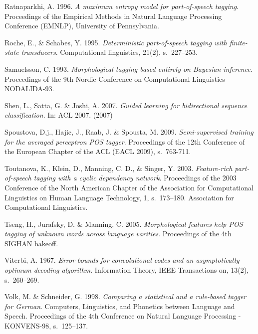 \documentclass[utf8,bachelor,manualbib]{gradu3}
\begin{document}
\begin{thebibliography}{}
Ratnaparkhi, A. 1996. \textit{A maximum entropy model for part-of-speech tagging}. Proceedings of the Empirical Methods in Natural Language Processing Conference (EMNLP), University of Pennsylvania.

Roche, E., \& Schabes, Y. 1995. \textit{Deterministic part-of-speech tagging with finite-state transducers}. Computational linguistics, 21(2), s.~227--253.

Samuelsson, C. 1993. \textit{Morphological tagging based entirely on Bayesian inference}. Proceedings of the 9th Nordic Conference on Computational Linguistics NODALIDA-93.

Shen, L., Satta, G. \& Joshi, A. 2007. \textit{Guided learning for bidirectional sequence classification}. In: ACL 2007. (2007)

Spoustova, D.j., Hajic, J., Raab, J. \& Spousta, M. 2009. \textit{Semi-supervised training for the averaged perceptron POS tagger}. Proceedings of the 12th Conference of the
European Chapter of the ACL (EACL 2009), s.~763-711.

Toutanova, K., Klein, D., Manning, C. D., \& Singer, Y. 2003. \textit{Feature-rich part-of-speech tagging with a cyclic dependency network}. Proceedings of the 2003 Conference of the North American Chapter of the Association for Computational Linguistics on Human Language Technology, 1, s.~173--180. Association for Computational Linguistics.

Tseng, H., Jurafsky, D. \& Manning, C. 2005. \textit{Morphological features help POS tagging of unknown words across language varities}. Proceedings of the 4th SIGHAN bakeoff.

Viterbi, A. 1967. \textit{Error bounds for convolutional codes and an asymptotically optimum decoding algorithm}. Information Theory, IEEE Transactions on, 13(2), s.~260--269.

Volk, M. \& Schneider, G. 1998. \textit{Comparing a statistical and a rule-based tagger for German}. Computers, Linguistics, and Phonetics between Language and Speech. Proceedings
of the 4th Conference on Natural Language Processing - KONVENS-98, s.~125--137.

\end{thebibliography}
\end{document}
